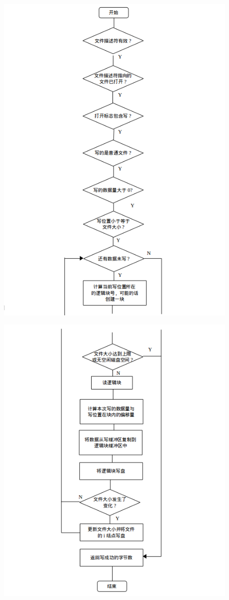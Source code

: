 \documentclass[nofonts]{ctexart}
\begin{document}
\begin{itemize}
  \includegraphics[width=12cm]{./images/./write_1.png}

  \includegraphics[width=12cm]{./images/./write_2.png}
  \end{itemize}
\end{document}

